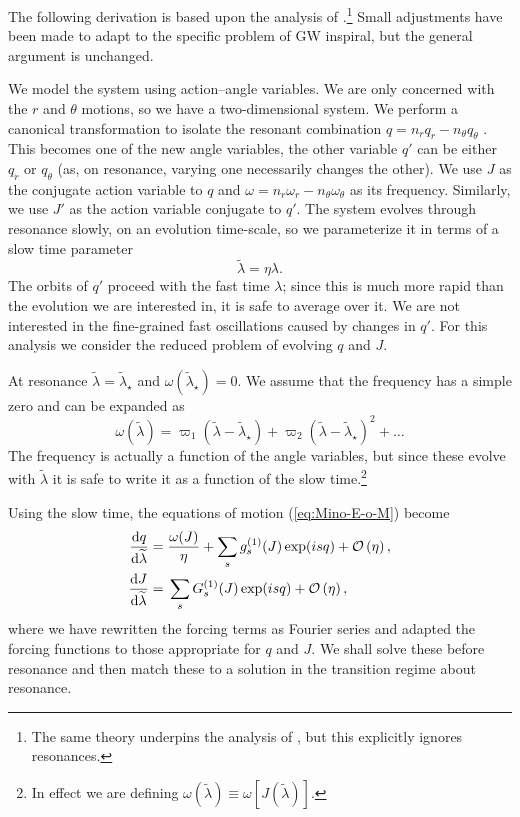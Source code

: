 The following derivation is based upon the analysis of \citet{Kevorkian1987}.\footnote{The same theory underpins the analysis of \citet{Hinderer2008}, but this explicitly ignores resonances.} Small adjustments have been made to adapt to the specific problem of GW inspiral, but the general argument is unchanged.

We model the system using action--angle variables. We are only concerned with the $r$ and $\theta$ motions, so we have a two-dimensional system. We perform a canonical transformation  to isolate the resonant combination $q = n_r q_r - n_\theta q_\theta$ \citep{Bosley1992}. This becomes one of the new angle variables, the other variable $q'$ can be either $q_r$ or $q_\theta$ (as, on resonance, varying one necessarily changes the other). We use $J$ as the conjugate action variable to $q$ and $\omega = n_r \omega_r - n_\theta \omega_\theta$ as its frequency. Similarly, we use $J'$ as the action variable conjugate to $q'$. The system evolves through resonance slowly, on an evolution time-scale, so we parameterize it in terms of a slow time parameter
\begin{equation}
\widetilde{\lambda} = \eta\lambda.
\end{equation}
The orbits of $q'$ proceed with the fast time $\lambda$; since this is much more rapid than the evolution we are interested in, it is safe to average over it. We are not interested in the fine-grained fast oscillations caused by changes in $q'$. For this analysis we consider the reduced problem of evolving $q$ and $J$.

At resonance $\widetilde{\lambda} = \widetilde{\lambda}_\star$ and $\omega\left(\widetilde{\lambda}_\star\right) = 0$. We assume that the frequency has a simple zero and can be expanded as
\begin{equation}
\omega\left(\widetilde{\lambda}\right) = \varpi_1\left(\widetilde{\lambda} - \widetilde{\lambda}_\star\right) + \varpi_2\left(\widetilde{\lambda} - \widetilde{\lambda}_\star\right)^2 + \ldots
\label{eq:omega-series}
\end{equation}
The frequency is actually a function of the angle variables, but since these evolve with $\widetilde{\lambda}$ it is safe to write it as a function of the slow time.\footnote{In effect we are defining $\omega\left(\tilde{\lambda}\right) \equiv \omega\left[J\left(\tilde{\lambda}\right)\right]$.}

Using the slow time, the equations of motion (\ref{eq:Mino-E-o-M}) become
\begin{subequations}
\begin{align}
\dfrac{\mathrm{d} {q}}{\mathrm{d} {\widetilde{\lambda}}} = {} & \dfrac{\omega(J)}{\eta} + \sum_s g_s^{(1)}(J)\exp(is q)  + \mathcal{O}\left({\eta}\right), \\
\dfrac{\mathrm{d} {J}}{\mathrm{d} {\widetilde{\lambda}}} = {} & \sum_s G_s^{(1)}(J)\exp(is q) + \mathcal{O}\left({\eta}\right),
\end{align}
\end{subequations}
where we have rewritten the forcing terms as Fourier series and adapted the forcing functions to those appropriate for $q$ and $J$. We shall solve these before resonance and then match these to a solution in the transition regime about resonance.

